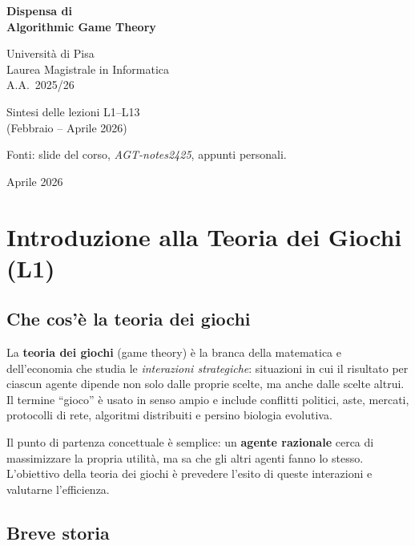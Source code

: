 \documentclass[12pt,a4paper,twoside]{book}
\theoremstyle{plain}
\theoremstyle{definition}
\begin{document}
\begin{titlepage}
\centering
\vspace*{3cm}
{\LARGE\bfseries Dispensa di\\[0.4em] Algorithmic Game Theory\par}
\vspace{1.5cm}
{\large Università di Pisa\\
Laurea Magistrale in Informatica\\
A.A.\ 2025/26\par}
\vspace{1cm}
{\normalsize Sintesi delle lezioni L1--L13\\
(Febbraio -- Aprile 2026)\par}
\vspace{0.8cm}
{\small Fonti: slide del corso, \textit{AGT-notes2425}, appunti personali.\par}
\vfill
{\small Aprile 2026}
\end{titlepage}

\frontmatter
\tableofcontents

\mainmatter

\chapter{Introduzione alla Teoria dei Giochi (L1)}

\section{Che cos'è la teoria dei giochi}

La \textbf{teoria dei giochi} (game theory) è la branca della matematica e dell'economia che studia le \emph{interazioni strategiche}: situazioni in cui il risultato per ciascun agente dipende non solo dalle proprie scelte, ma anche dalle scelte altrui. Il termine ``gioco'' è usato in senso ampio e include conflitti politici, aste, mercati, protocolli di rete, algoritmi distribuiti e persino biologia evolutiva.

Il punto di partenza concettuale è semplice: un \textbf{agente razionale} cerca di massimizzare la propria utilità, ma sa che gli altri agenti fanno lo stesso. L'obiettivo della teoria dei giochi è prevedere l'esito di queste interazioni e valutarne l'efficienza.

\section{Breve storia}
\end{document}
